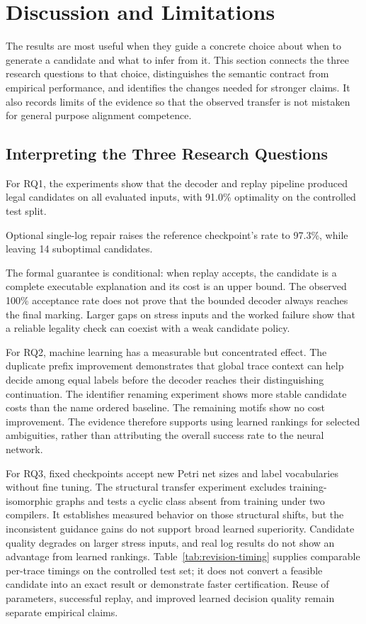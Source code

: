\section{Discussion and Limitations}
\label{sec:discussion}

The results are most useful when they guide a concrete choice about when to generate a candidate and what to infer from it. This section connects the three research questions to that choice, distinguishes the semantic contract from empirical performance, and identifies the changes needed for stronger claims. It also records limits of the evidence so that the observed transfer is not mistaken for general purpose alignment competence.

\subsection{Interpreting the Three Research Questions}

For RQ1, the experiments show that the decoder and replay pipeline produced legal candidates on all evaluated inputs, with 91.0\% optimality on the controlled test split. \begin{revised}Optional single-log repair raises the reference checkpoint's rate to 97.3\%, while leaving 14 suboptimal candidates.\end{revised} The formal guarantee is conditional: when replay accepts, the candidate is a complete executable explanation and its cost is an upper bound. The observed 100\% acceptance rate does not prove that the bounded decoder always reaches the final marking. Larger gaps on stress inputs and the worked failure show that a reliable legality check can coexist with a weak candidate policy.

For RQ2, machine learning has a measurable but concentrated effect. The duplicate prefix improvement demonstrates that global trace context can help decide among equal labels before the decoder reaches their distinguishing continuation. The identifier renaming experiment shows more stable candidate costs than the name ordered baseline. The remaining motifs show no cost improvement. The evidence therefore supports using learned rankings for selected ambiguities, rather than attributing the overall success rate to the neural network.

\begin{revised}For RQ3, fixed checkpoints accept new Petri net sizes and label vocabularies without fine tuning. The structural transfer experiment excludes training-isomorphic graphs and tests a cyclic class absent from training under two compilers. It establishes measured behavior on those structural shifts, but the inconsistent guidance gains do not support broad learned superiority. Candidate quality degrades on larger stress inputs, and real log results do not show an advantage from learned rankings. Table~\ref{tab:revision-timing} supplies comparable per-trace timings on the controlled test set; it does not convert a feasible candidate into an exact result or demonstrate faster certification. Reuse of parameters, successful replay, and improved learned decision quality remain separate empirical claims.\end{revised}

